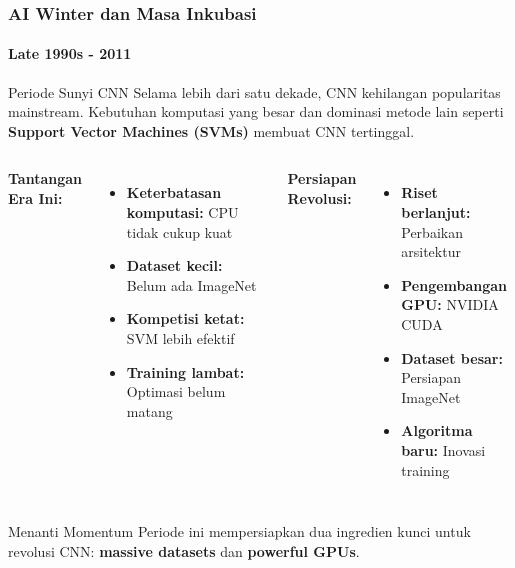 \documentclass[t,aspectratio=169,xcolor=dvipsnames]{beamer}
\begin{document}
\begin{frame}
    \frametitle{AI Winter dan Masa Inkubasi}
    \framesubtitle{Late 1990s - 2011}
    \small

    \begin{alertblock}{Periode Sunyi CNN}
        Selama lebih dari satu dekade, CNN kehilangan popularitas mainstream. Kebutuhan komputasi yang besar dan dominasi metode lain seperti \textbf{Support Vector Machines (SVMs)} membuat CNN tertinggal.
    \end{alertblock}
    \footnotesize

    \begin{columns}[t]
        \textbf{Tantangan Era Ini:}
        \begin{itemize}
            \item \textbf{Keterbatasan komputasi:} CPU tidak cukup kuat
            \item \textbf{Dataset kecil:} Belum ada ImageNet
            \item \textbf{Kompetisi ketat:} SVM lebih efektif
            \item \textbf{Training lambat:} Optimasi belum matang
        \end{itemize}

        \textbf{Persiapan Revolusi:}
        \begin{itemize}
            \item \textbf{Riset berlanjut:} Perbaikan arsitektur
            \item \textbf{Pengembangan GPU:} NVIDIA CUDA
            \item \textbf{Dataset besar:} Persiapan ImageNet
            \item \textbf{Algoritma baru:} Inovasi training
        \end{itemize}
    \end{columns}

    \begin{exampleblock}{Menanti Momentum}
        Periode ini mempersiapkan dua ingredien kunci untuk revolusi CNN: \textbf{massive datasets} dan \textbf{powerful GPUs}.
    \end{exampleblock}
\end{frame}
\end{document}

